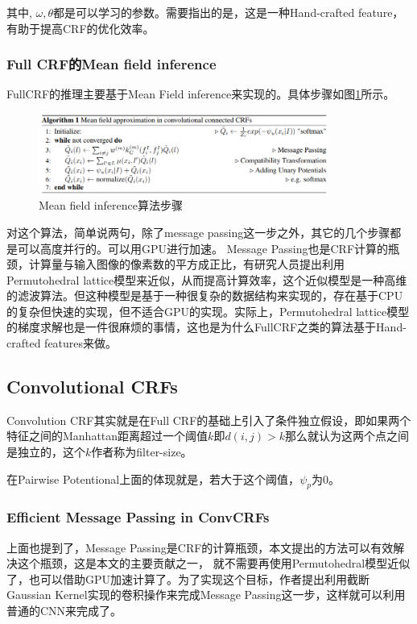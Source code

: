 其中, $\omega, \theta$都是可以学习的参数。需要指出的是，这是一种Hand-crafted feature，有助于提高CRF的优化效率。

\subsubsection{Full CRF的Mean field inference}

FullCRF的推理主要基于Mean Field inference来实现的。具体步骤如图\ref{ConvCRF0}所示。

\begin{figure}[!hbtp]
\centering
\includegraphics[width=0.85\textwidth]{SemanticSLAM/ConvCRF0.png}
\caption{Mean field inference算法步骤}
\label{ConvCRF0}
\end{figure}


对这个算法，简单说两句，除了message passing这一步之外，其它的几个步骤都是可以高度并行的。可以用GPU进行加速。 Message Passing也是CRF计算的瓶颈，计算量与输入图像的像素数的平方成正比，有研究人员提出利用Permutohedral lattice模型来近似，从而提高计算效率，这个近似模型是一种高维的滤波算法。但这种模型是基于一种很复杂的数据结构来实现的，存在基于CPU的复杂但快速的实现，但不适合GPU的实现。实际上，Permutohedral lattice模型的梯度求解也是一件很麻烦的事情，这也是为什么FullCRF之类的算法基于Hand-crafted features来做。

\subsection{Convolutional CRFs}

Convolution CRF其实就是在Full CRF的基础上引入了条件独立假设，即如果两个特征之间的Manhattan距离超过一个阈值$k$即$d(i, j) > k$那么就认为这两个点之间是独立的，这个$k$作者称为filter-size。

在Pairwise Potentional上面的体现就是，若大于这个阈值，$\psi_p$为0。

\subsubsection{Efficient Message Passing in ConvCRFs }

上面也提到了，Message Passing是CRF的计算瓶颈，本文提出的方法可以有效解决这个瓶颈，这是本文的主要贡献之一， 就不需要再使用Permutohedral模型近似了，也可以借助GPU加速计算了。为了实现这个目标，作者提出利用截断Gaussian Kernel实现的卷积操作来完成Message Passing这一步，这样就可以利用普通的CNN来完成了。

